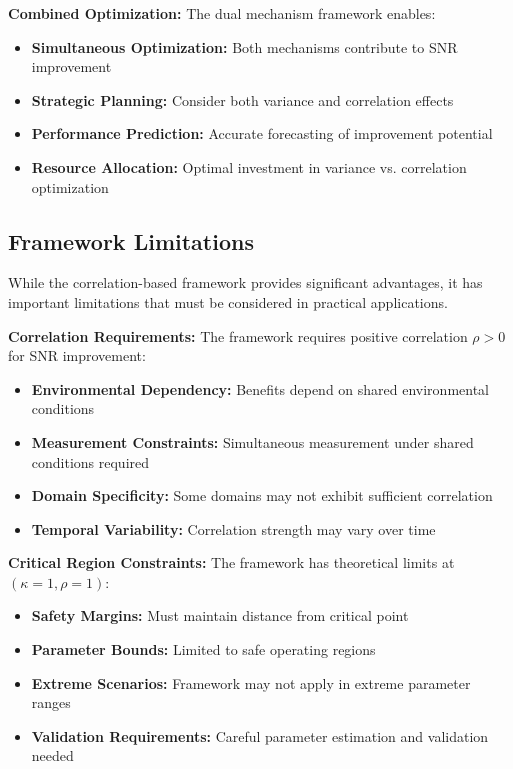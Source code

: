\textbf{Combined Optimization:}
The dual mechanism framework enables:
\begin{itemize}
    \item \textbf{Simultaneous Optimization:} Both mechanisms contribute to SNR improvement
    \item \textbf{Strategic Planning:} Consider both variance and correlation effects
    \item \textbf{Performance Prediction:} Accurate forecasting of improvement potential
    \item \textbf{Resource Allocation:} Optimal investment in variance vs. correlation optimization
\end{itemize}

\subsection{Framework Limitations}

While the correlation-based framework provides significant advantages, it has important limitations that must be considered in practical applications.

\textbf{Correlation Requirements:}
The framework requires positive correlation $\rho > 0$ for SNR improvement:
\begin{itemize}
    \item \textbf{Environmental Dependency:} Benefits depend on shared environmental conditions
    \item \textbf{Measurement Constraints:} Simultaneous measurement under shared conditions required
    \item \textbf{Domain Specificity:} Some domains may not exhibit sufficient correlation
    \item \textbf{Temporal Variability:} Correlation strength may vary over time
\end{itemize}

\textbf{Critical Region Constraints:}
The framework has theoretical limits at $(\kappa=1, \rho=1)$:
\begin{itemize}
    \item \textbf{Safety Margins:} Must maintain distance from critical point
    \item \textbf{Parameter Bounds:} Limited to safe operating regions
    \item \textbf{Extreme Scenarios:} Framework may not apply in extreme parameter ranges
    \item \textbf{Validation Requirements:} Careful parameter estimation and validation needed
\end{itemize}

